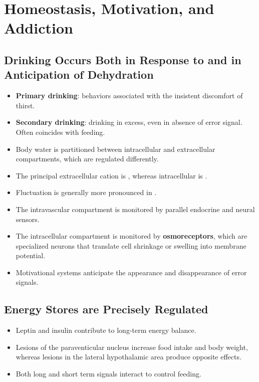 \documentclass[12pt,a4paper]{article}
\begin{document}
\section{Homeostasis, Motivation, and Addiction}
\subsection{Drinking Occurs Both in Response to and in Anticipation of Dehydration}
\begin{itemize}
    \item \textbf{Primary drinking}: behaviors associated with the insistent discomfort of thirst.
    \item \textbf{Secondary drinking}: drinking in excess, even in absence of error signal. Often coincides with feeding.
    \item Body water is partitioned between intracellular and extracellular compartments, which are regulated differently.
    \item The principal extracellular cation is , whereas intracellular is .
    \item Fluctuation is generally more pronounced in .
    \item The intravascular compartment is monitored by parallel endocrine and neural sensors.
    \item The intracellular compartment is monitored by \textbf{osmoreceptors}, which are specialized neurons that translate cell shrinkage or swelling into membrane potential.
    \item Motivational systems anticipate the appearance and disappearance of error signals.
\end{itemize}

\subsection{Energy Stores are Precisely Regulated}
\begin{itemize}
    \item Leptin and insulin contribute to long-term energy balance.
    \item Lesions of the paraventicular nucleus increase food intake and body weight, whereas lesions in the lateral hypothalamic area produce opposite effects. 
    \item Both long and short term signals interact to control feeding.
\end{itemize}
\end{document}
